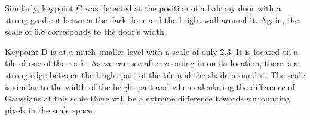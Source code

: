 Similarly, keypoint C was detected at the position of a balcony door with a strong gradient between the dark door and the bright wall around it. Again, the scale of 6.8 corresponds to the door's width. 

Keypoint D is at a much smaller level with a scale of only 2.3. It is located on a tile of one of the roofs. As we can see after zooming in on its location, there is a strong edge between the bright part of the tile and the shade around it. The scale is similar to the width of the bright part and when calculating the difference of Gaussians at this scale there will be a extreme difference towards surrounding pixels in the scale space.